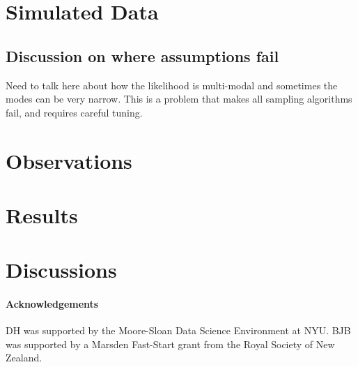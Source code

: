 \documentclass[12pt]{emulateapj}
\begin{document}
\begin{table*}[hbtp]
\begin{threeparttable}
\begin{tablenotes}
\end{tablenotes}
\end{threeparttable}
\label{tab:priortable}
\end{table*}



\section{Simulated Data}

\subsection{Discussion on where assumptions fail}

Need to talk here about how the likelihood is multi-modal and sometimes the modes can be very narrow. 
This is a problem that makes all sampling algorithms fail, and requires careful tuning.


\section{Observations}

\section{Results}


\section{Discussions}



\paragraph{Acknowledgements}
DH was supported by the Moore-Sloan Data Science Environment at NYU.
BJB was supported by a Marsden Fast-Start grant from the Royal Society of
New Zealand.



\end{document}
